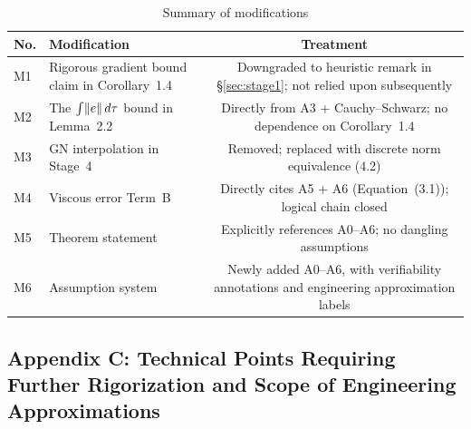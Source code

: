 \begin{table}[h]
\centering
\caption{Summary of modifications}
\begin{tabular}{llc}
\toprule
No. & Modification & Treatment \\
\midrule
M1 & Rigorous gradient bound claim in Corollary~1.4 & Downgraded to heuristic remark in \S\ref{sec:stage1}; not relied upon subsequently \\
M2 & The $\int \lVert e \rVert \, d\tau$ bound in Lemma~2.2 & Directly from A3 + Cauchy--Schwarz; no dependence on Corollary~1.4 \\
M3 & GN interpolation in Stage~4 & Removed; replaced with discrete norm equivalence (4.2) \\
M4 & Viscous error Term~B & Directly cites A5 + A6 (Equation~(3.1)); logical chain closed \\
M5 & Theorem statement & Explicitly references A0--A6; no dangling assumptions \\
M6 & Assumption system & Newly added A0--A6, with verifiability annotations and engineering approximation labels \\
\bottomrule
\end{tabular}
\end{table}

\subsection*{Appendix C: Technical Points Requiring Further Rigorization and Scope of Engineering Approximations}

